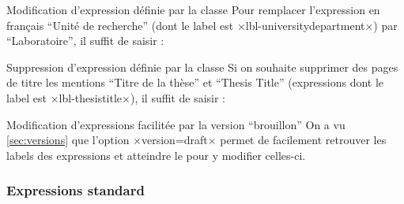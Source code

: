 \begin{table}
  \centering
  
  \caption{Expressions de la \yatcl (classées par ordre
    alphabétique de leurs valeurs en français) et labels correspondants}
  \label{tab:expressions-cles}
\end{table}

\begin{dbexample}{Modification d'expression définie par la classe}{}
  Pour remplacer l'expression en français \enquote{Unit\'e de recherche} (dont le label est
  ×lbl-universitydepartment×) par \enquote{Laboratoire}, il suffit de
  saisir :
\begin{preamblecode}[title=Par exemple dans le \File{\configurationfile}]
\end{preamblecode}
\end{dbexample}
%
\begin{dbexample}{Suppression d'expression définie par la classe}{}
  Si on souhaite supprimer des pages de titre les mentions \enquote{Titre de la
    thèse} et \foreignquote{english}{Thesis Title} (expressions dont le label
  est ×lbl-thesistitle×), il suffit de saisir :
\begin{preamblecode}[title=Par exemple dans le \File{\configurationfile}]
\end{preamblecode}
\end{dbexample}

\begin{dbremark}{Modification d'expressions facilitée par la version
    \enquote{brouillon}}{}
  On a vu \vref{sec:versions} que l'option ×version=draft× permet de facilement
  retrouver les labels des expressions et atteindre le \File{\configurationfile}
  pour y modifier celles-ci.
\end{dbremark}

\subsubsection{Expressions standard}
\label{sec:expressions-standard}

